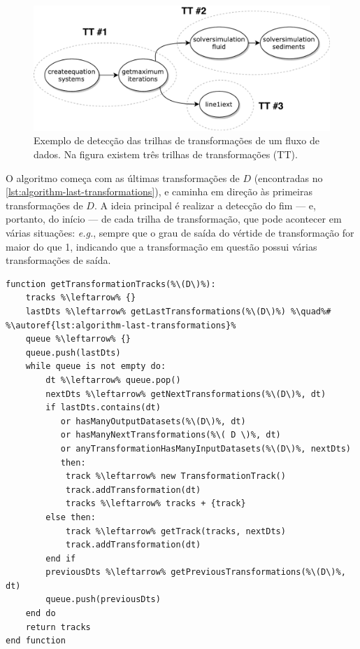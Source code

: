 \begin{figure}[htb]
    \centering
    \includegraphics[width=\textwidth]{img/transformation-tracks}
    \caption[Exemplo de detecção das trilhas de transformações.]{Exemplo de detecção das trilhas de transformações de um fluxo de dados. Na figura existem três trilhas de transformações (\textsc{TT}).}%
    \label{fig:transformation-tracks}
\end{figure}

O algoritmo começa com as últimas transformações de \( D \) (encontradas no \autoref{lst:algorithm-last-transformations}), e caminha em direção às primeiras transformações de \( D \). A ideia principal é realizar a detecção do fim --- e, portanto, do início --- de cada trilha de transformação, que pode acontecer em várias situações: \textit{e.g.}, sempre que o grau de saída do vértide de transformação for maior do que 1, indicando que a transformação em questão possui várias transformações de saída.

\begin{minipage}[c]{0.95\textwidth}
\begin{lstlisting}[language=pseudocode,label={lst:algorithm-transformation-tracks},caption={[Detecção das trilhas de transformações]Detecção do rastro do fluxo de dados no nível de trilhas de transformações.}]
function getTransformationTracks(%\(D\)%):
    tracks %\leftarrow% {}
    lastDts %\leftarrow% getLastTransformations(%\(D\)%) %\quad%# %\autoref{lst:algorithm-last-transformations}%
    queue %\leftarrow% {}
    queue.push(lastDts)
    while queue is not empty do:
        dt %\leftarrow% queue.pop()
        nextDts %\leftarrow% getNextTransformations(%\(D\)%, dt)
        if lastDts.contains(dt)
           or hasManyOutputDatasets(%\(D\)%, dt)
           or hasManyNextTransformations(%\( D \)%, dt)
           or anyTransformationHasManyInputDatasets(%\(D\)%, nextDts)
           then:
            track %\leftarrow% new TransformationTrack()
            track.addTransformation(dt)
            tracks %\leftarrow% tracks + {track}
        else then:
            track %\leftarrow% getTrack(tracks, nextDts)
            track.addTransformation(dt)
        end if
        previousDts %\leftarrow% getPreviousTransformations(%\(D\)%, dt)
        queue.push(previousDts)
    end do
    return tracks
end function
\end{lstlisting}
\end{minipage}

